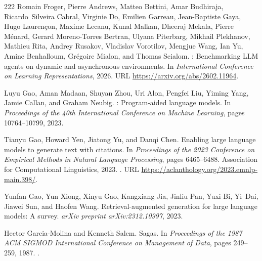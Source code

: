 \begin{thebibliography}{222}
Romain Froger, Pierre Andrews, Matteo Bettini, Amar Budhiraja, Ricardo~Silveira
  Cabral, Virginie Do, Emilien Garreau, Jean-Baptiste Gaya, Hugo
  Lauren{\c{c}}on, Maxime Lecanu, Kunal Malkan, Dheeraj Mekala, Pierre
  M{\'e}nard, Gerard Moreno-Torres Bertran, Ulyana Piterbarg, Mikhail
  Plekhanov, Mathieu Rita, Andrey Rusakov, Vladislav Vorotilov, Mengjue Wang,
  Ian Yu, Amine Benhalloum, Gr{\'e}goire Mialon, and Thomas Scialom.
: Benchmarking {LLM} agents on dynamic and asynchronous
  environments.
\newblock In \emph{International Conference on Learning Representations}, 2026.
\newblock URL \url{https://arxiv.org/abs/2602.11964}.

Luyu Gao, Aman Madaan, Shuyan Zhou, Uri Alon, Pengfei Liu, Yiming Yang, Jamie
  Callan, and Graham Neubig.
: Program-aided language models.
\newblock In \emph{Proceedings of the 40th International Conference on Machine
  Learning}, pages 10764--10799, 2023{}.

Tianyu Gao, Howard Yen, Jiatong Yu, and Danqi Chen.
\newblock Enabling large language models to generate text with citations.
\newblock In \emph{Proceedings of the 2023 Conference on Empirical Methods in
  Natural Language Processing}, pages 6465--6488. Association for Computational
  Linguistics, 2023{}.
\newblock {}.
\newblock URL \url{https://aclanthology.org/2023.emnlp-main.398/}.

Yunfan Gao, Yun Xiong, Xinyu Gao, Kangxiang Jia, Jinliu Pan, Yuxi Bi, Yi~Dai,
  Jiawei Sun, and Haofen Wang.
\newblock Retrieval-augmented generation for large language models: A survey.
\newblock \emph{arXiv preprint arXiv:2312.10997}, 2023{}.

Hector Garcia-Molina and Kenneth Salem.
\newblock Sagas.
\newblock In \emph{Proceedings of the 1987 ACM SIGMOD International Conference
  on Management of Data}, pages 249--259, 1987.
\newblock {}.


\end{thebibliography}
